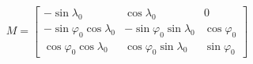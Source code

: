 \documentclass{article}
\begin{document}
$$
M =
 \begin{bmatrix}
  -\sin λ_0 & \cos λ_0 & 0 \\
  -\sin φ_0 \cos λ_0 & -\sin φ_0 \sin λ_0 & \cos φ_0 \\
  \cos φ_0 \cos λ_0 & \cos φ_0 \sin λ_0 & \sin φ_0
 \end{bmatrix}
$$
\end{document}
